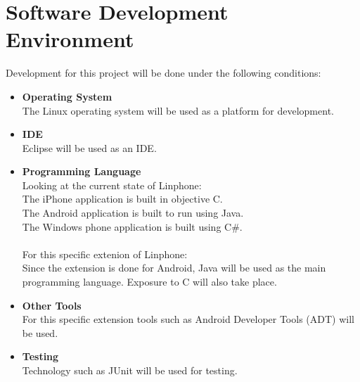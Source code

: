 \documentclass[11pt]{article}
\begin{document}
\section{Software Development Environment}
Development for this project will be done under the following conditions:\\
\begin{itemize}
\item \textbf{Operating System} \\
The Linux operating system will be used as a platform for development.\\
\item \textbf{IDE} \\
Eclipse will be used as an IDE.\\
\item \textbf{Programming Language} \\
Looking at the current state of Linphone:\\
The iPhone application is built in objective C.\\
The Android application is built to run using Java.\\
The Windows phone application is built using C\#.\\
\\
For this specific extenion of Linphone:\\
Since the extension is done for Android, Java will be used as the main programming language. Exposure to C will also take place.\\
\item \textbf{Other Tools} \\
For this specific extension tools such as Android Developer Tools (ADT) will be used.\\
\item \textbf{Testing} \\
Technology such as JUnit will be used for testing.\\
\end{itemize}
\end{document}

